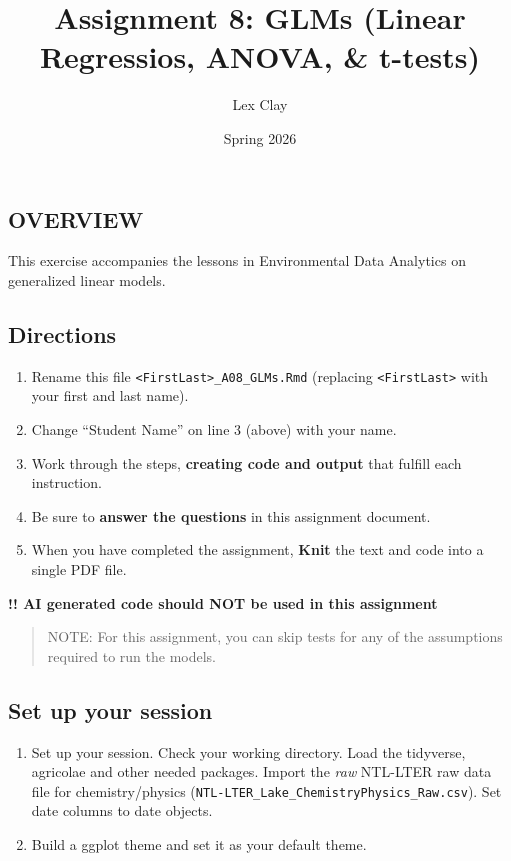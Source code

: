 \documentclass[
]{article}
\title{Assignment 8: GLMs (Linear Regressios, ANOVA, \& t-tests)}
\author{Lex Clay}
\date{Spring 2026}
\providecommand{\tightlist}{%
  \setlength{\itemsep}{0pt}\setlength{\parskip}{0pt}}
\begin{document}
\maketitle

\subsection{OVERVIEW}\label{overview}

This exercise accompanies the lessons in Environmental Data Analytics on
generalized linear models.

\subsection{Directions}\label{directions}

\begin{enumerate}
\def\labelenumi{\arabic{enumi}.}
\tightlist
\item
  Rename this file
  \texttt{\textless{}FirstLast\textgreater{}\_A08\_GLMs.Rmd} (replacing
  \texttt{\textless{}FirstLast\textgreater{}} with your first and last
  name).
\item
  Change ``Student Name'' on line 3 (above) with your name.
\item
  Work through the steps, \textbf{creating code and output} that fulfill
  each instruction.
\item
  Be sure to \textbf{answer the questions} in this assignment document.
\item
  When you have completed the assignment, \textbf{Knit} the text and
  code into a single PDF file.
\end{enumerate}

\textbf{!! AI generated code should NOT be used in this assignment}

\begin{quote}
NOTE: For this assignment, you can skip tests for any of the assumptions
required to run the models.
\end{quote}

\subsection{Set up your session}\label{set-up-your-session}

\begin{enumerate}
\def\labelenumi{\arabic{enumi}.}
\item
  Set up your session. Check your working directory. Load the tidyverse,
  agricolae and other needed packages. Import the \emph{raw} NTL-LTER
  raw data file for chemistry/physics
  (\texttt{NTL-LTER\_Lake\_ChemistryPhysics\_Raw.csv}). Set date columns
  to date objects.
\item
  Build a ggplot theme and set it as your default theme.
\end{enumerate}
\end{document}
